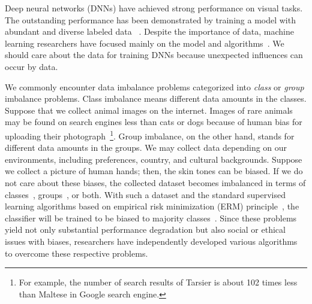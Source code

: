 Deep neural networks (DNNs) have achieved strong performance on visual tasks.
The outstanding performance has been demonstrated by training a model with abundant and diverse labeled data
~\cite{deng2009imagenet, lin2014microsoft}.
Despite the importance of data, machine learning researchers have focused mainly on the model and algorithms~\cite{sambasivan2021everyone}.
We should care about the data for training DNNs because unexpected influences can occur by data.

We commonly encounter data imbalance problems categorized into \emph{class} or \emph{group} imbalance problems.
Class imbalance means different data amounts in the classes.
Suppose that we collect animal images on the internet.
Images of rare animals may be found on search engines less than cats or dogs because of human bias for uploading their photograph~\footnote{For example, the number of search results of Tarsier is about 102 times less than Maltese in Google search engine.}.
Group imbalance, on the other hand, stands for different data amounts in the groups.
We may collect data depending on our environments, including preferences, country, and cultural backgrounds.
Suppose we collect a picture of human hands; then, the skin tones can be biased.
If we do not care about these biases, the collected dataset becomes imbalanced in terms of classes~\cite{cui2019class,zhang2023deep}, groups~\cite{whang2021responsible}, or both.
With such a dataset and the standard supervised learning algorithms based on empirical risk minimization (ERM) principle~\cite{vapnik1999nature}, the classifier will be trained to 
be biased to majority classes~\cite{geirhos2020shortcut}.
Since these problems yield not only substantial performance degradation but also social or ethical issues with biases, researchers have independently developed various algorithms~\cite{arjovsky2019invariant,bahng2020learning,sagawa2019distributionally,teney2020unshuffling,tartaglione2021end, lee2021learning,LfF,liu2021just, kim2022learning,yao2022improving,hwang2022selecmix,kirichenko2023last,cao2019learning,ren2020balanced,samuel2021distributional, shen2016relay,park2022majority,kim2020m2m,liu2019large,zhang2022correct} to overcome these respective problems.

